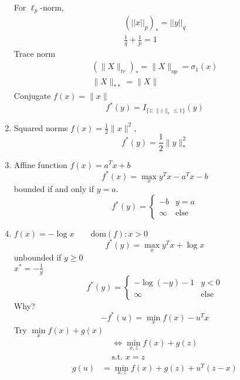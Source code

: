 \documentclass[10pt]{article}
\begin{document}
\begin{enumerate}
For $\ell_p$-norm,
\begin{align*}
(||x||_p)_* = ||y||_q\\
\frac{1}{q} + \frac{1}{p} = 1
\end{align*}
Trace norm
\begin{align*}
(\|X\|_{tr})_* = \| X \|_{op} = \sigma_1(x)\\
\|X\|_{**} = \|X\|
\end{align*}
Conjugate $f(x) = \|x\|$
\begin{equation*}
f^*(y) = I_{\{z:\|z\|_*\le 1\}} (y)
\end{equation*}
\item Squared norms $f(x) = \frac{1}{2} \| x \| ^2$,
\begin{equation*}
f^*(y) = \frac{1}{2} \| y \|_*^2
\end{equation*}
\item Affine function
$f(x) = a^Tx + b$
\begin{equation*}
f^*(x) = \max\limits_x y^T x - a^T x - b
\end{equation*}
bounded if and only if $y = a$.
\begin{equation*}
f^*(y) = \left\{
\begin{array}{ll}
-b &  y = a\\
\infty & \text{else}
\end{array}
\right.
\end{equation*}
\item $f(x) = -\log x \qquad \text{dom}(f): x > 0$
\begin{equation*}
f^*(y) = \max\limits_x y^T x + \log x
\end{equation*}
unbounded if $y \ge 0$\\
$x^* = -\frac{1}{y}$
\begin{equation*}
f^*(y) = \left\{
\begin{array}{ll}
-\log(-y) - 1 & y<0\\
\infty	& \text{else}
\end{array}\right.
\end{equation*}
Why?
\begin{equation*}
-f^*(u) = \min\limits_x f(x) - u^T x
\end{equation*}
Try $\min\limits_x f(x) + g(x)$
\begin{align*}
\Longleftrightarrow \min\limits_{x, z} f(x) + g(z)\\
\text{s.t. } x = z
\end{align*}
\begin{align*}
g(u) &= \min\limits_{x, z} f(x) + g(z) + u^T(z-x)\\

\end{align*}
\end{enumerate}
\end{document}
